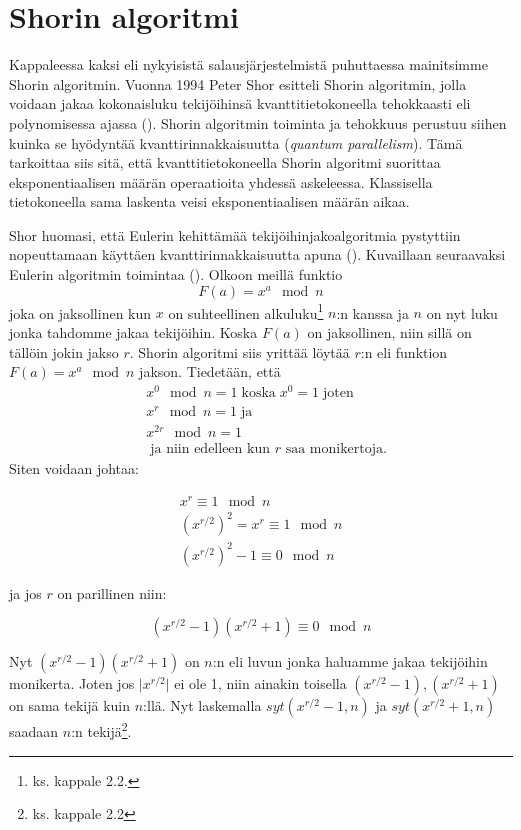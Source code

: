 \section{Shorin algoritmi}
Kappaleessa kaksi eli nykyisistä salausjärjestelmistä puhuttaessa mainitsimme Shorin algoritmin. Vuonna 1994 Peter Shor esitteli Shorin algoritmin, jolla voidaan jakaa kokonaisluku tekijöihinsä kvanttitietokoneella tehokkaasti eli polynomisessa ajassa (\cite{hayward2008quantum}). Shorin algoritmin toiminta ja tehokkuus perustuu siihen kuinka se hyödyntää kvanttirinnakkaisuutta (\emph{quantum parallelism}). Tämä tarkoittaa siis sitä, että kvanttitietokoneella Shorin algoritmi suorittaa eksponentiaalisen määrän operaatioita yhdessä askeleessa. Klassisella tietokoneella sama laskenta veisi eksponentiaalisen määrän aikaa.

Shor huomasi, että Eulerin kehittämää tekijöihinjakoalgoritmia pystyttiin nopeuttamaan käyttäen kvanttirinnakkaisuutta apuna (\cite{doi:10.1080/23742917.2016.1226650}). Kuvaillaan seuraavaksi Eulerin algoritmin toimintaa (\cite{hayward2008quantum}). Olkoon meillä funktio 
\[F(a) = x^{a} \mod n\] 
joka on jaksollinen kun $x$ on suhteellinen alkuluku\footnote{ks. kappale 2.2.} $n$:n kanssa ja $n$ on nyt luku jonka tahdomme jakaa tekijöihin. Koska $F(a)$ on jaksollinen, niin sillä on tällöin jokin jakso $r$. Shorin algoritmi siis yrittää löytää $r$:n eli funktion $F(a) = x^{a} \mod n$ jakson. Tiedetään, että 
\begin{equation}
    \begin{split}
    & x^{0} \mod n = 1 \; \text{koska} \;  x^0 = 1 \; \text{joten} \\
    & x^{r} \mod n = 1 \; \text{ja} \\
    & x^{2r} \mod n = 1 \\
    & \; \text{ja niin edelleen kun $r$ saa monikertoja.}
    \end{split}
\end{equation}
Siten voidaan johtaa:

\begin{align*}
    x^{r} \equiv 1 \mod n \\
    (x^{r/2})^{2} = x^{r} \equiv 1 \mod n \\
    (x^{r/2})^{2} - 1 \equiv 0 \mod n
\end{align*}

ja jos $r$ on parillinen niin:

\[(x^{r/2} - 1)(x^{r/2} + 1) \equiv 0 \mod n\]

Nyt $(x^{r/2} - 1)(x^{r/2} + 1)$ on $n$:n eli luvun jonka haluamme jakaa tekijöihin monikerta. Joten jos $\lvert x^{r/2} \rvert$ ei ole 1, niin ainakin toisella $(x^{r/2} - 1), (x^{r/2} + 1)$ on sama tekijä kuin $n$:llä. Nyt laskemalla $syt(x^{r/2} - 1, n)$ ja $syt(x^{r/2} + 1, n)$ saadaan $n$:n tekijä\footnote{ks. kappale 2.2}.

